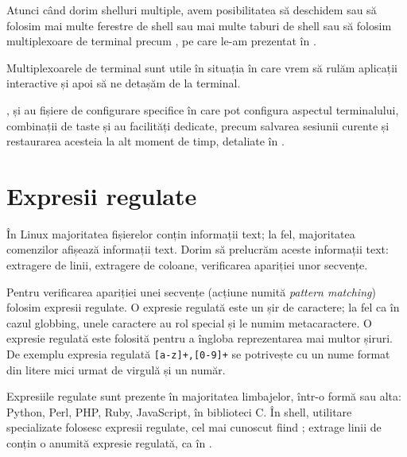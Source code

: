 Atunci când dorim shelluri multiple, avem posibilitatea să deschidem sau să
folosim mai multe ferestre de shell sau mai multe taburi de shell sau să
folosim multiplexoare de terminal precum ,  pe care le-am prezentat în
.

Multiplexoarele de terminal sunt utile în situația în care vrem să rulăm
aplicații interactive și apoi să ne detașăm de la terminal.

,  și  au fișiere de configurare specifice în care pot configura
aspectul terminalului, combinații de taste și au facilități dedicate, precum
salvarea sesiunii curente și restaurarea acesteia la alt moment de timp, detaliate în .

\section{Expresii regulate}
\label{sec:cli:regex}

În Linux majoritatea fișierelor conțin informații text; la fel, majoritatea
comenzilor afișează informații text. Dorim să prelucrăm aceste informații text:
extragere de linii, extragere de coloane, verificarea apariției unor secvențe.

Pentru verificarea apariției unei secvențe (acțiune numită \textit{pattern matching})
folosim expresii regulate. O expresie regulată este un șir de caractere; la fel ca în cazul globbing, unele
caractere au rol special și le numim metacaractere. O expresie regulată este
folosită pentru a îngloba reprezentarea mai multor șiruri. De exemplu expresia regulată \verb|[a-z]+,[0-9]+| se potrivește cu un nume format din litere mici urmat de virgulă și un număr.

Expresiile regulate sunt prezente în majoritatea limbajelor, într-o formă sau
alta: Python, Perl, PHP, Ruby, JavaScript, în biblioteci C. În shell, utilitare specializate folosesc expresii regulate, cel mai cunoscut fiind ; 
extrage linii de conțin o anumită expresie regulată, ca în .

